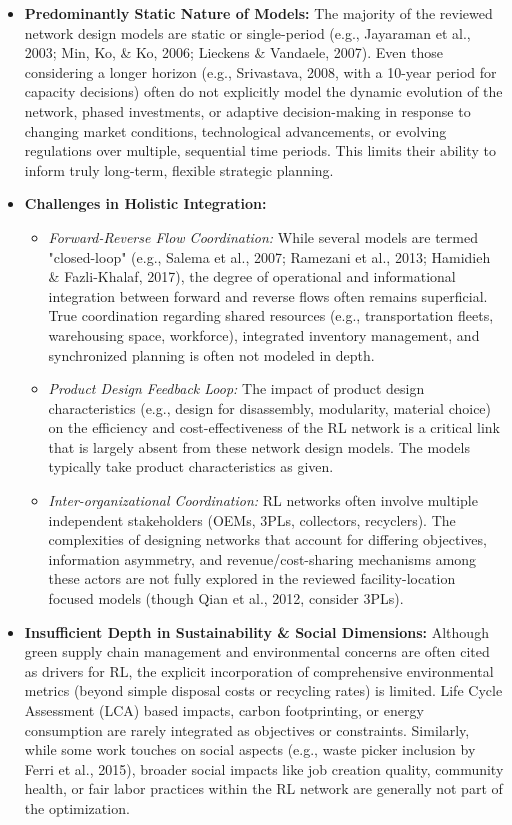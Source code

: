 \begin{itemize}
    \item \textbf{Predominantly Static Nature of Models:}
        The majority of the reviewed network design models are static or single-period (e.g., Jayaraman et al., 2003; Min, Ko, \& Ko, 2006; Lieckens \& Vandaele, 2007). Even those considering a longer horizon (e.g., Srivastava, 2008, with a 10-year period for capacity decisions) often do not explicitly model the dynamic evolution of the network, phased investments, or adaptive decision-making in response to changing market conditions, technological advancements, or evolving regulations over multiple, sequential time periods. This limits their ability to inform truly long-term, flexible strategic planning.

    \item \textbf{Challenges in Holistic Integration:}
        \begin{itemize}
            \item \textit{Forward-Reverse Flow Coordination:} While several models are termed "closed-loop" (e.g., Salema et al., 2007; Ramezani et al., 2013; Hamidieh \& Fazli-Khalaf, 2017), the degree of operational and informational integration between forward and reverse flows often remains superficial. True coordination regarding shared resources (e.g., transportation fleets, warehousing space, workforce), integrated inventory management, and synchronized planning is often not modeled in depth.
            \item \textit{Product Design Feedback Loop:} The impact of product design characteristics (e.g., design for disassembly, modularity, material choice) on the efficiency and cost-effectiveness of the RL network is a critical link that is largely absent from these network design models. The models typically take product characteristics as given.
            \item \textit{Inter-organizational Coordination:} RL networks often involve multiple independent stakeholders (OEMs, 3PLs, collectors, recyclers). The complexities of designing networks that account for differing objectives, information asymmetry, and revenue/cost-sharing mechanisms among these actors are not fully explored in the reviewed facility-location focused models (though Qian et al., 2012, consider 3PLs).
        \end{itemize}

    \item \textbf{Insufficient Depth in Sustainability \& Social Dimensions:}
        Although green supply chain management and environmental concerns are often cited as drivers for RL, the explicit incorporation of comprehensive environmental metrics (beyond simple disposal costs or recycling rates) is limited. Life Cycle Assessment (LCA) based impacts, carbon footprinting, or energy consumption are rarely integrated as objectives or constraints. Similarly, while some work touches on social aspects (e.g., waste picker inclusion by Ferri et al., 2015), broader social impacts like job creation quality, community health, or fair labor practices within the RL network are generally not part of the optimization.


\end{itemize}
